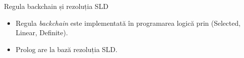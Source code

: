 \documentclass[xcolor=pdftex,romanian,colorlinks]{beamer}
\begin{document}
%
%
%
%
%
%


\begin{frame}{Regula {backchain} și rezoluția SLD}
\begin{itemize}
	\item Regula \textit{backchain} este implementată în programarea logică prin  (Selected, Linear, Definite).
	
	\medskip
	\item Prolog are la bază rezoluția SLD.
\end{itemize}
\end{frame}
\end{document}
